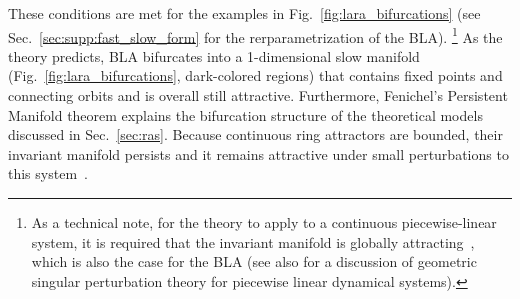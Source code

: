 \documentclass{article} %
\newcounter{ct}
\theoremstyle{definition}
\theoremstyle{remark}
\renewcommand{\cite}{\citep}
\begin{document}
These conditions are met for the examples in Fig.~\ref{fig:lara_bifurcations} (see Sec.~\ref{sec:supp:fast_slow_form} for the rerparametrization of the BLA).
\footnote{As a technical note, for the theory to apply to a continuous piecewise-linear system, it is required that the invariant manifold is globally attracting~\cite{simpson2018}, which is also the case for the BLA (see also \citep{prohens2013canard,prohens2016slow} for a discussion of geometric singular perturbation theory for piecewise linear dynamical systems).}
As the theory predicts, BLA bifurcates into a 1-dimensional slow manifold (Fig.~\ref{fig:lara_bifurcations}, dark-colored regions) that contains fixed points and connecting orbits and is overall still attractive.
Furthermore, Fenichel's Persistent Manifold theorem explains the bifurcation structure of the theoretical models discussed in Sec.~\ref{sec:ras}.
Because continuous ring attractors are bounded, their invariant manifold persists and it remains attractive under small perturbations to this system~\citep{wiggins1994}.


\end{document}
